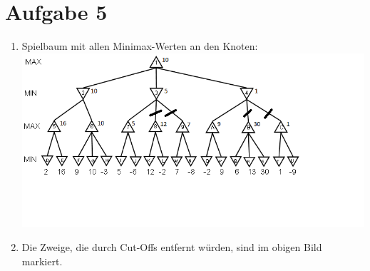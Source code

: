 \documentclass[a4paper,10pt]{article}
\begin{document}
\section*{Aufgabe 5}
\begin{enumerate}[~~a)]

\item Spielbaum mit allen Minimax-Werten an den Knoten: \\
\includegraphics[scale=1]{Aufgabe5}

\item Die Zweige, die durch Cut-Offs entfernt würden, sind im obigen Bild markiert.

\end{enumerate}
\end{document}

